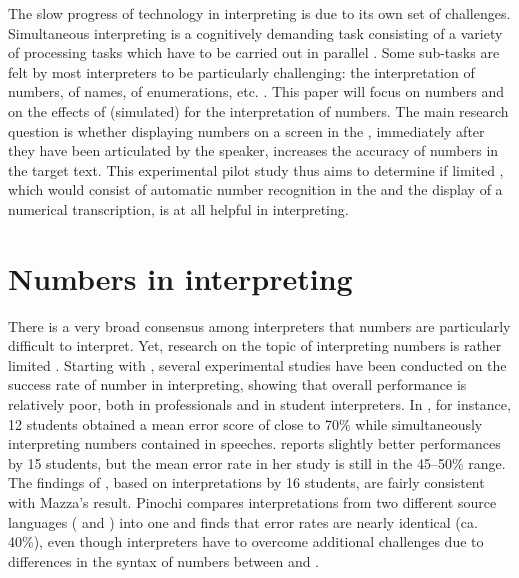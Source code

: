 \documentclass[output=paper]{langsci/langscibook}
\begin{document}
The slow progress of technology in interpreting is due to its own set of challenges. Simultaneous interpreting is a cognitively demanding task consisting of a variety of processing tasks which have to be carried out in parallel \citep{Gile1995, Seeber2011a}. Some sub-tasks are felt by most interpreters to be particularly challenging: the interpretation of numbers, of names, of enumerations, etc. \citep{Gile2009}. This paper will focus on numbers and on the effects of (simulated)  for the interpretation of numbers. The main research question is whether displaying numbers on a screen in the , immediately after they have been articulated by the speaker, increases the accuracy of numbers in the target text. This experimental pilot study thus aims to determine if limited , which would consist of automatic number recognition in the  and the display of a numerical transcription, is at all helpful in interpreting.

\section{Numbers in interpreting}

There is a very broad consensus among interpreters that numbers are particularly difficult to interpret. Yet, research on the topic of interpreting numbers is rather limited \citep[287]{Mead2015}. Starting with \citet{Braun1996}, several experimental studies have been conducted on the success rate of number  in interpreting, showing that overall performance is relatively poor, both in professionals and in student interpreters. In \citet{Braun1996}, for instance, 12 students obtained a mean error score of close to 70\% while simultaneously interpreting numbers contained in speeches. \citet{Mazza2001} reports slightly better performances by 15 students, but the mean error rate in her study is still in the 45--50\% range. The findings of \citet{Pinochi2009}, based on interpretations by 16 students, are fairly consistent with Mazza’s result. Pinochi compares interpretations from two different source languages ( and ) into one  and finds that error rates are nearly identical (ca. 40\%), even though interpreters have to overcome additional challenges due to differences in the syntax of numbers between  and .
\end{document}
